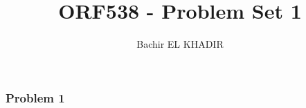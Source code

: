 \documentclass[12pt]{article}
\title{ORF538 - Problem Set 1}
\author{Bachir EL KHADIR }
\newcommand{\Q}[1]{\subsubsection*{Problem #1}}
\begin{document}
\maketitle

\Q{1}
\end{document}
